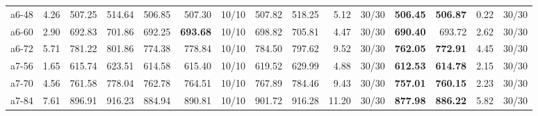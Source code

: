 \documentclass[aspectratio=1610]{beamer}
\begin{document}
\begin{frame}[noframenumbering]
\begin{table}[]
{\begin{tabular}{lrrrrrrrrrrrrrr}
a6-48                                          & 4.26                                                         & 507.25  & \multicolumn{1}{r|}{514.64}   & 506.85          & 507.30                                 & \multicolumn{1}{r|}{10/10} & 507.82        & 518.25         & 5.12         & \multicolumn{1}{r|}{30/30}       & \textbf{506.45}     & {\color[HTML]{FE0000} \textbf{506.87}}    & 0.22     & 30/30   \\
a6-60                                          & 2.90                                                         & 692.83  & \multicolumn{1}{r|}{701.86}   & 692.25          & {\color[HTML]{FE0000} \textbf{693.68}} & \multicolumn{1}{r|}{10/10} & 698.82        & 705.81         & 4.47         & \multicolumn{1}{r|}{30/30}       & \textbf{690.40}     & {\color[HTML]{000000} 693.72}             & 2.62     & 30/30   \\
a6-72                                          & 5.71                                                         & 781.22  & \multicolumn{1}{r|}{801.86}   & 774.38          & 778.84                                 & \multicolumn{1}{r|}{10/10} & 784.50        & 797.62         & 9.52         & \multicolumn{1}{r|}{30/30}       & \textbf{762.05}     & {\color[HTML]{FE0000} \textbf{772.91}}    & 4.45     & 30/30   \\
a7-56                                          & 1.65                                                         & 615.74  & \multicolumn{1}{r|}{623.51}   & 614.58          & 615.40                                 & \multicolumn{1}{r|}{10/10} & 619.52        & 629.99         & 4.88         & \multicolumn{1}{r|}{30/30}       & \textbf{612.53}     & {\color[HTML]{FE0000} \textbf{614.78}}    & 2.15     & 30/30   \\
a7-70                                          & 4.56                                                         & 761.58  & \multicolumn{1}{r|}{778.04}   & 762.78          & 764.51                                 & \multicolumn{1}{r|}{10/10} & 767.89        & 784.46         & 9.43         & \multicolumn{1}{r|}{30/30}       & \textbf{757.01}     & {\color[HTML]{FE0000} \textbf{760.15}}    & 2.23     & 30/30   \\
a7-84                                          & 7.61                                                         & 896.91  & \multicolumn{1}{r|}{916.23}   & 884.94          & 890.81                                 & \multicolumn{1}{r|}{10/10} & 901.72        & 916.28         & 11.20        & \multicolumn{1}{r|}{30/30}       & \textbf{877.98}     & {\color[HTML]{FE0000} \textbf{886.22}}    & 5.82     & 30/30   \\

\end{tabular}}
\end{table}
\end{frame}
\end{document}
